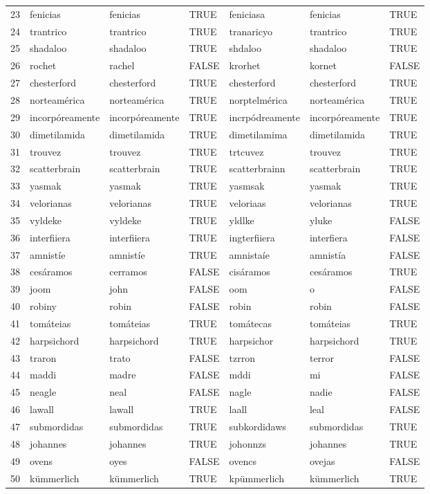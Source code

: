 \documentclass[paper=letter, fontsize=11pt]{scrartcl}
\numberwithin{equation}{section} %
\numberwithin{figure}{section} %
\numberwithin{table}{section} %
\begin{document}
\begin{table}[ht]
\begin{tabular}{rllllll}
  23 & fenicias & fenicias & TRUE & feniciasa & fenicias & TRUE \\ 
  24 & trantrico & trantrico & TRUE & tranaricyo & trantrico & TRUE \\ 
  25 & shadaloo & shadaloo & TRUE & shdaloo & shadaloo & TRUE \\ 
  26 & rochet & rachel & FALSE & krorhet & kornet & FALSE \\ 
  27 & chesterford & chesterford & TRUE & chesterford & chesterford & TRUE \\ 
  28 & norteamérica & norteamérica & TRUE & norptelmérica & norteamérica & TRUE \\ 
  29 & incorpóreamente & incorpóreamente & TRUE & incrpódreamente & incorpóreamente & TRUE \\ 
  30 & dimetilamida & dimetilamida & TRUE & dimetilamima & dimetilamida & TRUE \\ 
  31 & trouvez & trouvez & TRUE & trtcuvez & trouvez & TRUE \\ 
  32 & scatterbrain & scatterbrain & TRUE & scatterbrainn & scatterbrain & TRUE \\ 
  33 & yasmak & yasmak & TRUE & yasmsak & yasmak & TRUE \\ 
  34 & velorianas & velorianas & TRUE & veloriaas & velorianas & TRUE \\ 
  35 & vyldeke & vyldeke & TRUE & yldlke & yluke & FALSE \\ 
  36 & interfiiera & interfiiera & TRUE & ingterfiiera & interfiera & FALSE \\ 
  37 & amnistíe & amnistíe & TRUE & amnistaíe & amnistía & FALSE \\ 
  38 & cesáramos & cerramos & FALSE & cisáramos & cesáramos & TRUE \\ 
  39 & joom & john & FALSE & oom & o & FALSE \\ 
  40 & robiny & robin & FALSE & robin & robin & FALSE \\ 
  41 & tomáteias & tomáteias & TRUE & tomátecas & tomáteias & TRUE \\ 
  42 & harpsichord & harpsichord & TRUE & harpsichor & harpsichord & TRUE \\ 
  43 & traron & trato & FALSE & tzrron & terror & FALSE \\ 
  44 & maddi & madre & FALSE & mddi & mi & FALSE \\ 
  45 & neagle & neal & FALSE & nagle & nadie & FALSE \\ 
  46 & lawall & lawall & TRUE & laall & leal & FALSE \\ 
  47 & submordidas & submordidas & TRUE & subkordidaws & submordidas & TRUE \\ 
  48 & johannes & johannes & TRUE & johonnzs & johannes & TRUE \\ 
  49 & ovens & oyes & FALSE & ovencs & ovejas & FALSE \\ 
  50 & kümmerlich & kümmerlich & TRUE & kpümmerlich & kümmerlich & TRUE \\ 
   \hline
\end{tabular}
\end{table}
\end{document}
